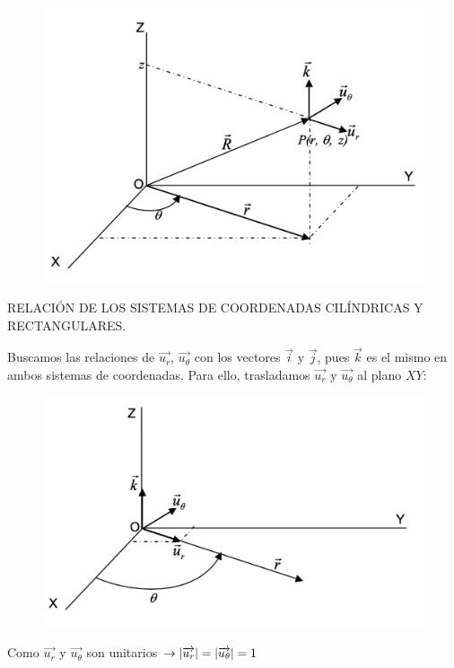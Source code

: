 \begin{figure}[H]
	\centering
	\includegraphics[width=.9\textwidth]{imagenes/apendices/APENDICESIM04.png}
\end{figure}


RELACIÓN DE LOS SISTEMAS DE COORDENADAS CILÍNDRICAS Y RECTANGULARES.

Buscamos las relaciones de $\overrightarrow{u_r}$, $\overrightarrow{u_{\theta}}$ con los vectores $\vec i$ y $\vec j$, pues $\vec k$ es el mismo en ambos sistemas de coordenadas. Para ello, trasladamos $\overrightarrow{u_r}$ y $\overrightarrow{u_{\theta}}$ al plano $XY$:

\begin{figure}[H]
	\centering
	\includegraphics[width=.9\textwidth]{imagenes/apendices/APENDICESIM04b.png}
\end{figure}

Como $\overrightarrow{u_r}$ y $\overrightarrow{u_{\theta}}$  son unitarios $\to \abs{\overrightarrow{u_r}}=\abs{\overrightarrow{u_{\theta}}}=1$ 

